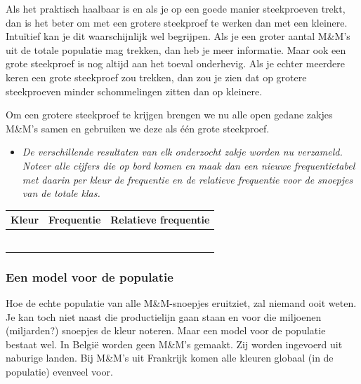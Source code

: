 \documentclass[11pt]{article}
\newcommand{\vraag}[2]{\begin{itemize}\item {\it #1} \vspace*{#2}\end{itemize}}
\begin{document}
Als het praktisch haalbaar is en als je op een goede manier steekproeven trekt, dan is het beter om
met een grotere steekproef te werken dan met een kleinere. Intuïtief kan je dit waarschijnlijk wel
begrijpen. Als je een groter aantal M\&M’s uit de totale populatie mag trekken, dan heb je meer
informatie. Maar ook een grote steekproef is nog altijd aan het toeval onderhevig. Als je echter
meerdere keren een grote steekproef zou trekken, dan zou je zien dat op grotere steekproeven minder
schommelingen zitten dan op kleinere.

Om een grotere steekproef te krijgen brengen we nu alle open gedane zakjes M\&M's samen en gebruiken
we deze als één grote steekproef.

\vraag{De verschillende resultaten van elk onderzocht zakje worden nu verzameld. Noteer alle
cijfers die op bord komen en maak dan een nieuwe frequentietabel met daarin per kleur de
frequentie en de relatieve frequentie voor de snoepjes van de totale klas.}{0cm}

\begin{center}
  \begin{tabular}{|p{2cm}|p{2cm}|p{2cm}|}
    \hline
    Kleur&Frequentie&Relatieve frequentie\\
    \hline
    &&\vspace*{0pt}\\
    \hline
    &&\vspace*{0pt}\\
    \hline
    &&\vspace*{0pt}\\
    \hline
    &&\vspace*{0pt}\\
    \hline
    &&\vspace*{0pt}\\
    \hline
    &&\vspace*{0pt}\\
    \hline
  \end{tabular}
\end{center}
\vspace{1cm}

\subsubsection{Een model voor de populatie}

Hoe de echte populatie van alle M\&M-snoepjes eruitziet, zal niemand ooit weten. Je kan toch niet
naast die productielijn gaan staan en voor die miljoenen (miljarden?) snoepjes de kleur noteren.
Maar een model voor de populatie bestaat wel. In België worden geen M\&M’s gemaakt. Zij worden
ingevoerd uit naburige landen. Bij M\&M’s uit Frankrijk komen alle kleuren globaal (in de populatie)
evenveel voor.
\end{document}
